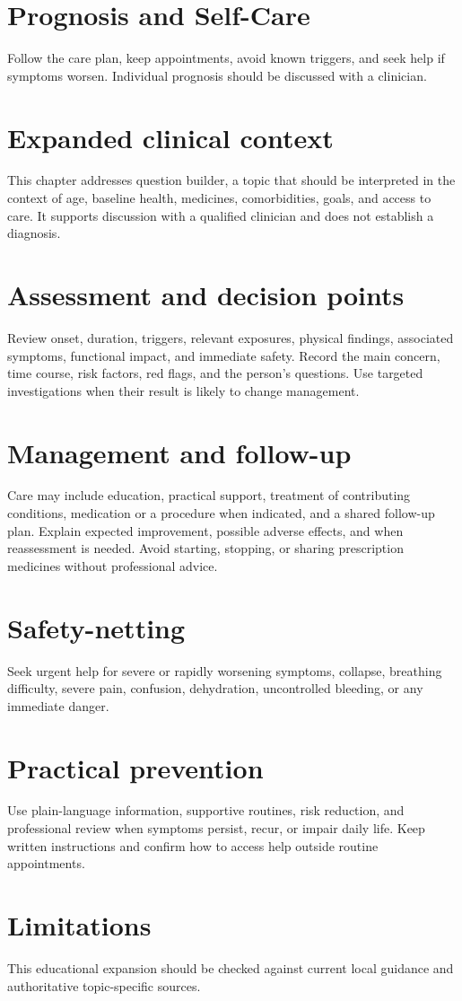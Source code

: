 \section*{Prognosis and Self-Care}
Follow the care plan, keep appointments, avoid known triggers, and seek help if symptoms worsen. Individual prognosis should be discussed with a clinician.

\section*{Expanded clinical context}
This chapter addresses question builder, a topic that should be interpreted in the context of age, baseline health, medicines, comorbidities, goals, and access to care. It supports discussion with a qualified clinician and does not establish a diagnosis.

\section*{Assessment and decision points}
Review onset, duration, triggers, relevant exposures, physical findings, associated symptoms, functional impact, and immediate safety. Record the main concern, time course, risk factors, red flags, and the person’s questions. Use targeted investigations when their result is likely to change management.

\section*{Management and follow-up}
Care may include education, practical support, treatment of contributing conditions, medication or a procedure when indicated, and a shared follow-up plan. Explain expected improvement, possible adverse effects, and when reassessment is needed. Avoid starting, stopping, or sharing prescription medicines without professional advice.

\section*{Safety-netting}
Seek urgent help for severe or rapidly worsening symptoms, collapse, breathing difficulty, severe pain, confusion, dehydration, uncontrolled bleeding, or any immediate danger.

\section*{Practical prevention}
Use plain-language information, supportive routines, risk reduction, and professional review when symptoms persist, recur, or impair daily life. Keep written instructions and confirm how to access help outside routine appointments.

\section*{Limitations}
This educational expansion should be checked against current local guidance and authoritative topic-specific sources.
\clearpage
